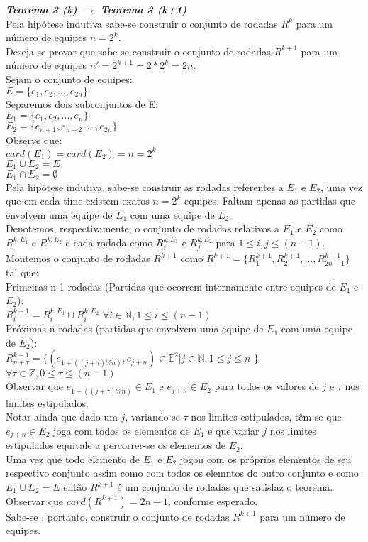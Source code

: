 \documentclass[twoside]{article}
\begin{document}
\begin{multicols}{2}
\textit{\textbf{Teorema 3 (k) $\rightarrow$ Teorema 3 (k+1)}}\\
Pela hipótese indutiva sabe-se construir o conjunto de rodadas $R^k$ para um número de equipes $n=2^k$.\\
Deseja-se provar que sabe-se construir o conjunto de rodadas $R^{k+1}$ para um número de equipes $n'=2^{k+1}=2*2^k=2n$.\\
Sejam o conjunto de equipes:\\
$E = \{e_1,e_2,\dots,e_{2n}\}$\\
Separemos dois subconjuntos de E:\\
$E_1 = \{e_1,e_2,...,e_{n}\}$\\
$E_2 = \{e_{n+1},e_{n+2},\dots,e_{2n}\}$\\
Observe que:\\
$card(E_1) = card(E_2) = n= 2^k$\\
$E_1 \cup E_2 = E$\\
$E_1 \cap E_2 = \emptyset$\\
Pela hipótese indutiva, sabe-se construir as rodadas referentes a $E_1$ e $E_2$, uma vez que em cada time existem exatos $n=2^k$ equipes. Faltam apenas as partidas que envolvem uma equipe de $E_1$ com uma equipe de $E_2$ \\
Denotemos, respectivamente, o conjunto de rodadas relativos a $E_1$ e $E_2$ como $R^{k,{E_1}}$ e $R^{k,{E_2}}$ e cada rodada como $R_i^{k,{E_1}}$ e $R_j^{k,{E_2}}$ para $1 \leq i,j \leq (n-1)$.\\
Montemos o conjunto de rodadas $R^{k+1}$ como $R^{k+1}=\{R_1^{k+1},R_2^{k+1},\dots,R_{2n-1}^{k+1}\}$ tal que:\\
Primeiras n-1 rodadas (Partidas que ocorrem internamente entre equipes de $E_1$ e $E_2$):\\
 $R_i^{k+1} = R_i^{k,{E_1}} \cup R_i^{k,{E_2}}$ $ \forall i \in \mathbb{N},1 \leq i \leq (n-1)$\\
Próximas n rodadas (partidas que envolvem uma equipe de $E_1$ com uma equipe de $E_2$):\\
$R_{n+\tau}^{k+1} = \{ ( e_{1+((j+\tau)\%n)},e_{j+n}) \in \mathbb{E}^2 |  j \in \mathbb{N},1 \leq j \leq n$ $\}$ $ \forall \tau \in \mathbb{Z},0 \leq \tau \leq (n-1)$\\
Observar que $e_{1+((j+\tau)\%n)} \in E_1$ e $e_{j+n} \in E_2$ para todos os valores de $j$ e $\tau$ nos limites estipulados.\\
Notar ainda que dado um $j$, variando-se $\tau$ nos limites estipulados, têm-se que $e_{j+n} \in E_2$ joga com todos os elementos de $E_1$ e que variar $j$ nos limites estipulados equivale a percorrer-se os elementos de $E_2$.\\
Uma vez que todo elemento de $E_1$ e $E_2$ jogou com os próprios elementos de seu respectivo conjunto assim como com todos os elemntos do outro conjunto e como $E_1 \cup E_2 = E$ então $R^{k+1}$ é um conjunto de rodadas que satisfaz o teorema. Observar que $card(R^{k+1}) = 2n-1$, conforme esperado.\\
Sabe-se , portanto, construir o conjunto de rodadas $R^{k+1}$ para um número de equipes.\\


\end{multicols}
\end{document}
